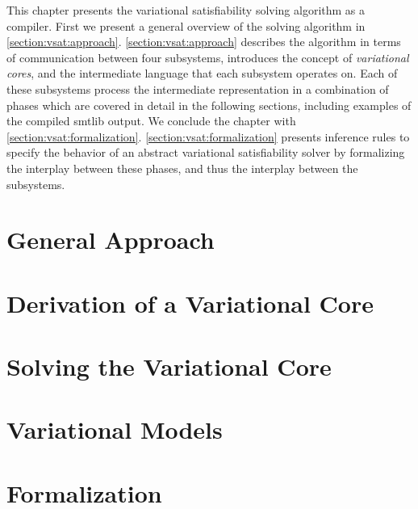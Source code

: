 \label{chapter:vsat}

This chapter presents the variational satisfiability solving algorithm as a
compiler. First we present a general overview of the solving algorithm in
\autoref{section:vsat:approach}. \autoref{section:vsat:approach} describes the
algorithm in terms of communication between four subsystems, introduces the
concept of \emph{variational cores}, and the intermediate language that each
subsystem operates on. Each of these subsystems process the intermediate
representation in a combination of phases which are covered in detail in the
following sections, including examples of the compiled \acl{smtlib} output. We
conclude the chapter with \autoref{section:vsat:formalization}.
\autoref{section:vsat:formalization} presents inference rules to specify the
behavior of an abstract variational satisfiability solver by formalizing the
interplay between these phases, and thus the interplay between the subsystems.

\section{General Approach}


\section{Derivation of a Variational Core}


\section{Solving the Variational Core}


\section{Variational Models}


\section{Formalization}


% 
%

